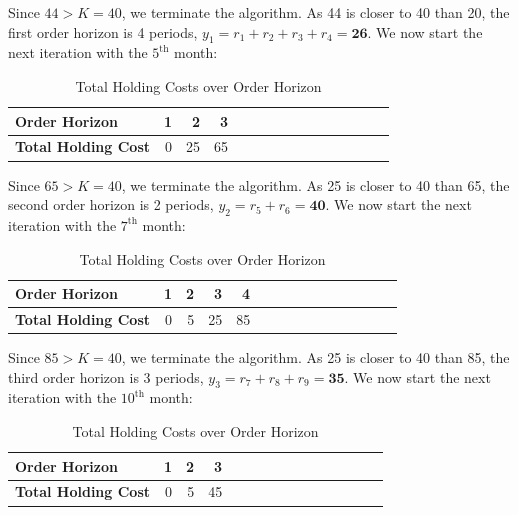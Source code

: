 \documentclass[12pt]{article}
\begin{document}
\noindent Since $44 > K = 40$, we terminate the algorithm. As 44 is closer to 40 than 20, the first order horizon is 4 periods, $y_{1} = r_{1} + r_{2} + r_{3} + r_{4}= \mathbf{26}$. We now start the next iteration with the $5^{\text{th}}$ month: 

\begin{table}[H]
    \centering
    \begin{tabular}{ l  r r  r  r  r  r  r  r  r  r  r  r  r  r }\toprule
        \textbf{Order Horizon} & 1 & 2 & 3  \\ \midrule
        \textbf{Total Holding Cost} & 0 & 25 & 65 \\ \bottomrule
    \end{tabular}
    \caption{Total Holding Costs over Order Horizon}
    \label{tab:1-partperiod2}
\end{table} 

\noindent Since $65 > K = 40$, we terminate the algorithm. As 25 is closer to 40 than 65, the second order horizon is 2 periods, $y_{2} = r_{5} + r_{6} = \mathbf{40}$. We now start the next iteration with the $7^{\text{th}}$ month: 

\begin{table}[H]
    \centering
    \begin{tabular}{ l  r r  r  r  r  r  r  r  r  r  r  r  r  r }\toprule
        \textbf{Order Horizon} & 1 & 2 & 3 & 4 \\ \midrule
        \textbf{Total Holding Cost} & 0 & 5 & 25 & 85 \\ \bottomrule
    \end{tabular}
    \caption{Total Holding Costs over Order Horizon}
    \label{tab:1-partperiod3}
\end{table} 

\noindent Since $85 > K = 40$, we terminate the algorithm. As 25 is closer to 40 than 85, the third order horizon is 3 periods, $y_{3} = r_{7} + r_{8} + r_{9} = \mathbf{35}$. We now start the next iteration with the $10^{\text{th}}$ month: 

\begin{table}[H]
    \centering
    \begin{tabular}{ l  r r  r  r  r  r  r  r  r  r  r  r  r  r }\toprule
        \textbf{Order Horizon} & 1 & 2 & 3 \\ \midrule
        \textbf{Total Holding Cost} & 0 & 5 & 45 \\ \bottomrule
    \end{tabular}
    \caption{Total Holding Costs over Order Horizon}
    \label{tab:1-partperiod3}
\end{table} 
\end{document}
